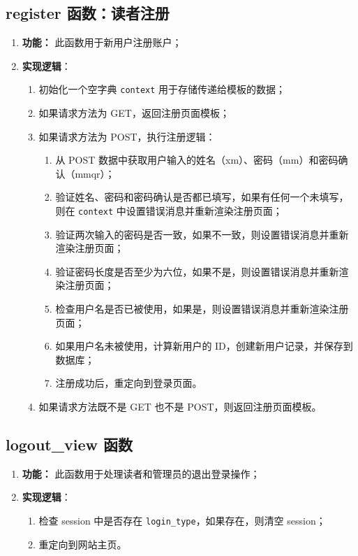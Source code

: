 \documentclass{ctexart}
\begin{document}
    \subsection{register 函数：读者注册}
\begin{enumerate}
    \item \textbf{功能：} 此函数用于新用户注册账户；
    \item \textbf{实现逻辑}：
    \begin{enumerate}
        \item 初始化一个空字典 \texttt{context} 用于存储传递给模板的数据；
        \item 如果请求方法为 GET，返回注册页面模板；
        \item 如果请求方法为 POST，执行注册逻辑：
        \begin{enumerate}
            \item 从 POST 数据中获取用户输入的姓名（xm）、密码（mm）和密码确认（mmqr）；
            \item 验证姓名、密码和密码确认是否都已填写，如果有任何一个未填写，则在 \texttt{context} 中设置错误消息并重新渲染注册页面；
            \item 验证两次输入的密码是否一致，如果不一致，则设置错误消息并重新渲染注册页面；
            \item 验证密码长度是否至少为六位，如果不是，则设置错误消息并重新渲染注册页面；
            \item 检查用户名是否已被使用，如果是，则设置错误消息并重新渲染注册页面；
            \item 如果用户名未被使用，计算新用户的 ID，创建新用户记录，并保存到数据库；
            \item 注册成功后，重定向到登录页面。
        \end{enumerate}
        \item 如果请求方法既不是 GET 也不是 POST，则返回注册页面模板。
    \end{enumerate}
\end{enumerate}

\subsection{logout\_view 函数}
\begin{enumerate}
    \item \textbf{功能：} 此函数用于处理读者和管理员的退出登录操作；
    \item \textbf{实现逻辑}：
    \begin{enumerate}
        \item 检查 session 中是否存在 \texttt{login\_type}，如果存在，则清空 session；
        \item 重定向到网站主页。
    \end{enumerate}
\end{enumerate}
\end{document}
